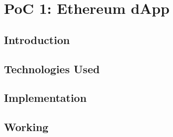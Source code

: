 \chapter{PoC 1: Ethereum dApp}\label{chapter:poc1}

\section{Introduction}

\section{Technologies Used}

\section{Implementation}

\section{Working}